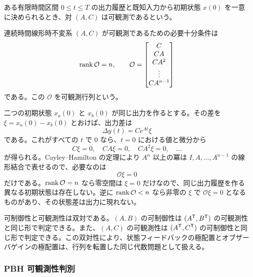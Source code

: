 \begin{definition}[可観測性]
ある有限時間区間 $0\le t\le T$ の出力履歴と既知入力から初期状態 $x(0)$ を一意に決められるとき、対 $(A,C)$ は可観測であるという。
\end{definition}

\begin{theorem}
連続時間線形時不変系 $(A,C)$ が可観測であるための必要十分条件は
\begin{equation}
  \operatorname{rank}\mathcal{O}=n,\qquad
  \mathcal{O}=\begin{bmatrix}C\\ CA\\ CA^2\\ \vdots\\ CA^{n-1}\end{bmatrix}
  \label{eq:kalman-observability-matrix}
\end{equation}
である。この $\mathcal{O}$ を可観測行列という。
\end{theorem}

\begin{derivation}
二つの初期状態 $x_a(0)$ と $x_b(0)$ が同じ出力を作るとする。その差を $\xi=x_a(0)-x_b(0)$ とおけば、出力差は
\begin{equation}
  \Delta y(t)=Ce^{At}\xi
\end{equation}
である。これがすべての $t$ で 0 なら、$t=0$ における値と微分から
\begin{equation}
  C\xi=0,\quad CA\xi=0,\quad CA^2\xi=0,\quad \ldots
\end{equation}
が得られる。Cayley--Hamilton の定理により $A^n$ 以上の冪は $I,A,\ldots,A^{n-1}$ の線形結合で表せるので、必要なのは
\begin{equation}
  \mathcal{O}\xi=0
\end{equation}
だけである。$\operatorname{rank}\mathcal{O}=n$ なら零空間は $\xi=0$ だけなので、同じ出力履歴を作る異なる初期状態は存在しない。逆に $\operatorname{rank}\mathcal{O}<n$ なら非零の $\xi$ で $\mathcal{O}\xi=0$ となるものがあり、その状態差は出力に現れない。
\end{derivation}

可制御性と可観測性は双対である。$(A,B)$ の可制御性は $(A^{\mathsf{T}},B^{\mathsf{T}})$ の可観測性と同じ形で判定できる。また、$(A,C)$ の可観測性は $(A^{\mathsf{T}},C^{\mathsf{T}})$ の可制御性と同じ形で判定できる。この双対性により、状態フィードバックの極配置とオブザーバゲインの極配置は、行列を転置した同じ代数問題として扱える。

\subsubsection{PBH 可観測性判別}

